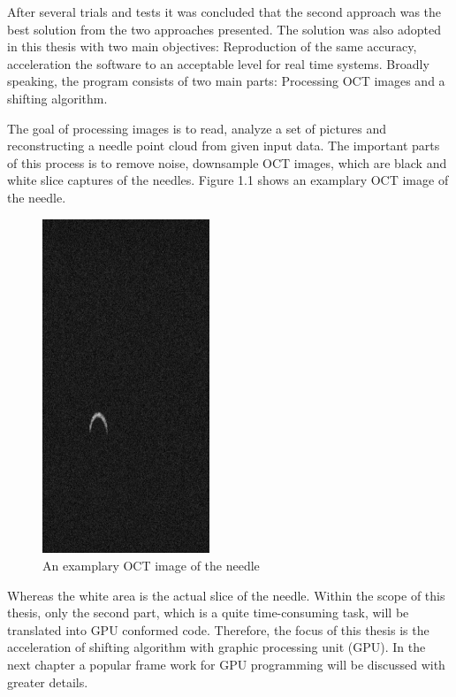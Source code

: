 After several trials and tests it was concluded that the second approach was the best solution from the two approaches presented. The solution was also adopted in this thesis with two main objectives: Reproduction of the same accuracy, acceleration the software to an acceptable level for real time systems. Broadly speaking, the program consists of two main parts: Processing OCT images and a shifting algorithm. 

The goal of processing images is to read, analyze a set of pictures and reconstructing a needle point cloud from given input data. The important parts of this process is to remove noise, downsample OCT images, which are black and white slice captures of the needles. Figure 1.1 shows an examplary OCT image of the needle.

\begin{figure}[t!]
	\centering
	\includegraphics[width=5cm]{images/OCTimageEx.jpg}
	\caption{An examplary OCT image of the needle}
	\label{ExampleOCTImage}
\end{figure}

Whereas the white area is the actual slice of the needle. Within the scope of this thesis, only the second part, which is a quite time-consuming task, will be translated into GPU conformed code. Therefore, the focus of this thesis is the acceleration of shifting algorithm with graphic processing unit (GPU). In the next chapter a popular frame work for GPU programming will be discussed with greater details.


